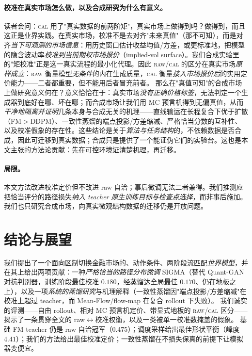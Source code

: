 \documentclass[11pt]{ctexart}
\newcommand{\raw}{\textsc{raw}}
\renewcommand{\cal}{\textsc{cal}}
\begin{document}
\paragraph{校准在真实市场怎么做，以及合成研究为什么有意义。}
读者会问：\cal{} 用了"真实数据的前两阶矩"，真实市场上做得到吗？做得到，而且这正是业界实践。在真实市场，校准不是去对齐"未来真值"（那不可知），而是对齐\emph{当下可观测的市场信息}：用历史窗口估计收益均值/方差，或更标准地，把模型的隐含波动率\emph{校准到当前期权市场报价}（implied-vol surface）。我们合成实验里的"矩校准"正是这一真实流程的最小化代理。因此 \raw{}/\cal{} 的区分在真实市场\emph{原样成立}：\raw{} 衡量模型\emph{无条件}的内在生成质量，\cal{} 衡量\emph{接入市场报价后}的实用定价能力——二者都重要，但不能用后者冒充前者。
那么在"真值可知"的合成市场上做研究意义何在？意义恰恰在于：真实市场\emph{没有正确价格标签}，无法判定一个生成器到底好在哪、坏在哪；而合成市场让我们用 MC 预言机得到无偏真值，从而\emph{干净地隔离并证明}几条本身与合成无关的机理——直线输运在长程复合下优于扩散（FM$>$DDPM）、一致性蒸馏的端点投影/方差缩减、严格恰当分数的互补性、以及校准假象的存在性。这些结论是关于\emph{算法与任务结构}的，不依赖数据是否合成，因此可迁移到真实数据；合成只是提供了一个能证伪它们的实验台。这也是本文主张的方法论贡献：先在可控环境证清楚机理，再迁移。

\paragraph{局限。}本文方法改进校准定价但不改进 raw 自洽；事后微调无法二者兼得。我们推测应把恰当评分的路径损失\emph{纳入 teacher 原生训练目标与检查点选择}，而非事后施加。我们也只研究合成市场，向真实微观结构数据的迁移仍是开放问题。

\section{结论与展望}
\label{sec:conclusion}

我们提出了一个面向区制切换金融市场的、动作条件、两阶段流匹配\emph{世界模型}，并在其上给出两项贡献：一种\emph{严格恰当的路径分布微调} SIGMA（替代 Quant-GAN 对抗判别器，训练阶段最佳校准 $0.180$，经蒸馏达全局最佳 $0.170$、仍在地板之上），以及一项\emph{系统的蒸馏研究}与机理解释（一致性蒸馏因"端点投影/方差缩减"在校准上超过 teacher，而 Mean-Flow/flow-map 在复合 rollout 下失败）。
我们诚实的评测——自由 rollout、相对 MC 预言机定价、带显式地板的 \raw{}/\cal{} 区分——揭示了一条贯穿全文的 raw$\leftrightarrow$校准权衡，以及一类被单一校准数掩盖的假象。
基础 FM teacher 仍是 raw 自洽冠军（$0.475$）；调度采样给出最佳形状平衡（峰度 $4.41$）；我们的方法给出最佳校准定价；一致性蒸馏在不损失保真的前提下让模拟器变便宜。
\end{document}
